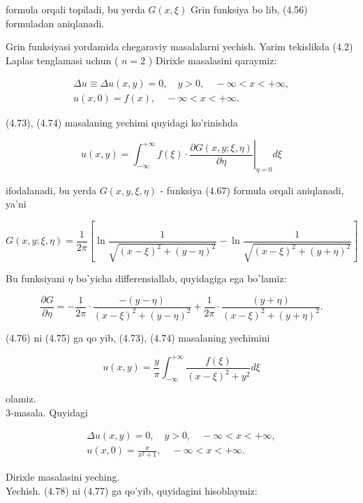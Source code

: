 \documentclass[10pt]{article}
\begin{document}
formula orqali topiladi, bu yerda $G(x, \xi)$ Grin funksiya bo lib, (4.56) formuladan aniqlanadi.

Grin funksiyasi yordamida chegaraviy masalalarni yechish. Yarim tekislikda (4.2) Laplas tenglamasi uchun ( $n=2$ ) Dirixle masalasini qaraymiz:


\begin{gather*}
\Delta u \equiv \Delta u(x, y)=0, \quad y>0, \quad-\infty<x<+\infty,  \tag{4.73}\\
u(x, 0)=f(x), \quad-\infty<x<+\infty . \tag{4.74}
\end{gather*}


(4.73), (4.74) masalaning yechimi quyidagi ko'rinishda


\begin{equation*}
u(x, y)=\left.\int_{-\infty}^{+\infty} f(\xi) \cdot \frac{\partial G(x, y ; \xi, \eta)}{\partial \eta}\right|_{\eta=0} d \xi \tag{4.75}
\end{equation*}


ifodalanadi, bu yerda $G(x, y, \xi, \eta)$ - funksiya (4.67) formula orqali aniqlanadi, ya'ni

$$
G(x, y ; \xi, \eta)=\frac{1}{2 \pi}\left[\ln \frac{1}{\sqrt{(x-\xi)^{2}+(y-\eta)^{2}}}-\ln \frac{1}{\sqrt{(x-\xi)^{2}+(y+\eta)^{2}}}\right]
$$

Bu funksiyani $\eta$ boˋyicha differensiallab, quyidagiga ega boˋlamiz:


\begin{equation*}
\frac{\partial G}{\partial \eta}=-\frac{1}{2 \pi} \cdot \frac{-(y-\eta)}{(x-\xi)^{2}+(y-\eta)^{2}}+\frac{1}{2 \pi} \cdot \frac{(y+\eta)}{(x-\xi)^{2}+(y+\eta)^{2}} . \tag{4.76}
\end{equation*}


(4.76) ni (4.75) ga qo yib, (4.73), (4.74) masalaning yechimini


\begin{equation*}
u(x, y)=\frac{y}{\pi} \int_{-\infty}^{+\infty} \frac{f(\xi)}{(x-\xi)^{2}+y^{2}} d \xi \tag{4.77}
\end{equation*}


olamiz.\\
3-masala. Quyidagi


\begin{gather*}
\Delta u(x, y)=0, \quad y>0, \quad-\infty<x<+\infty,  \tag{4.73}\\
u(x, 0)=\frac{x}{x^{2}+1}, \quad-\infty<x<+\infty . \tag{4.78}
\end{gather*}


Dirixle masalasini yeching.\\
Yechish. (4.78) ni (4.77) ga qo'yib, quyidagini hisoblaymiz:
\end{document}
